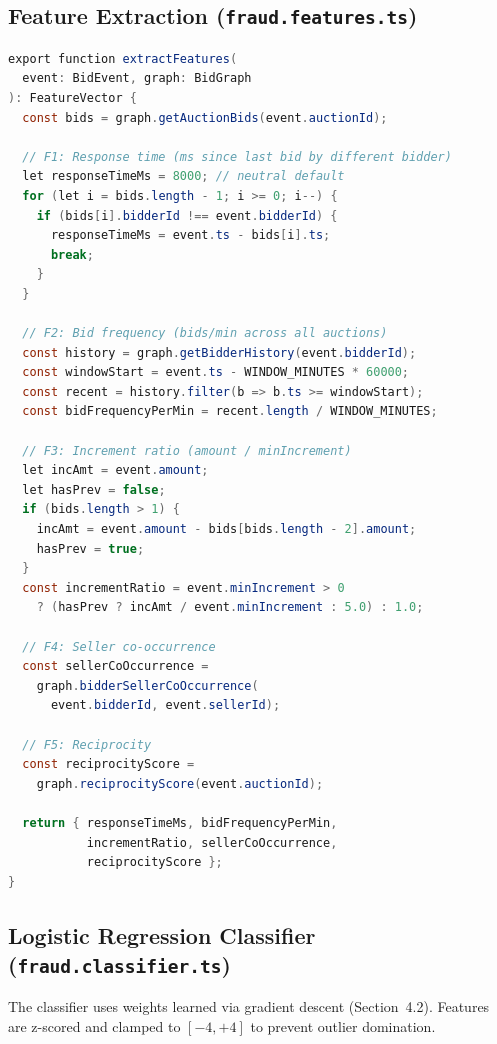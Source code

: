 \documentclass[11pt]{article}
\begin{document}
\subsection{Feature Extraction (\texttt{fraud.features.ts})}

\begin{lstlisting}[language=Java,caption={Five-feature extraction from the bid graph per event.}]
export function extractFeatures(
  event: BidEvent, graph: BidGraph
): FeatureVector {
  const bids = graph.getAuctionBids(event.auctionId);

  // F1: Response time (ms since last bid by different bidder)
  let responseTimeMs = 8000; // neutral default
  for (let i = bids.length - 1; i >= 0; i--) {
    if (bids[i].bidderId !== event.bidderId) {
      responseTimeMs = event.ts - bids[i].ts;
      break;
    }
  }

  // F2: Bid frequency (bids/min across all auctions)
  const history = graph.getBidderHistory(event.bidderId);
  const windowStart = event.ts - WINDOW_MINUTES * 60000;
  const recent = history.filter(b => b.ts >= windowStart);
  const bidFrequencyPerMin = recent.length / WINDOW_MINUTES;

  // F3: Increment ratio (amount / minIncrement)
  let incAmt = event.amount;
  let hasPrev = false;
  if (bids.length > 1) {
    incAmt = event.amount - bids[bids.length - 2].amount;
    hasPrev = true;
  }
  const incrementRatio = event.minIncrement > 0
    ? (hasPrev ? incAmt / event.minIncrement : 5.0) : 1.0;

  // F4: Seller co-occurrence
  const sellerCoOccurrence =
    graph.bidderSellerCoOccurrence(
      event.bidderId, event.sellerId);

  // F5: Reciprocity
  const reciprocityScore =
    graph.reciprocityScore(event.auctionId);

  return { responseTimeMs, bidFrequencyPerMin,
           incrementRatio, sellerCoOccurrence,
           reciprocityScore };
}
\end{lstlisting}

\subsection{Logistic Regression Classifier (\texttt{fraud.classifier.ts})}

The classifier uses weights learned via gradient descent (Section~4.2).
Features are z-scored and clamped to $[-4, +4]$ to prevent outlier
domination.
\end{document}
